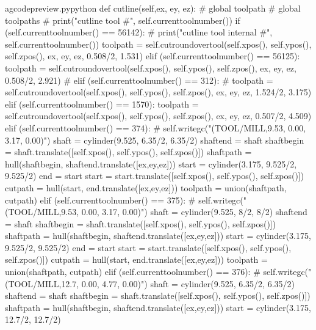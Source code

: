 \documentclass{ltxdoc}
\begin{document}
\lstset{firstnumber=\thegcpy}
\begin{writecode}{a}{gcodepreview.py}{python}
    def cutline(self,ex, ey, ez):
#        global toolpath
#        global toolpaths
#        print("cutline tool #", self.currenttoolnumber())
        if (self.currenttoolnumber() == 56142):
#                print("cutline tool internal #", self.currenttoolnumber())
            toolpath = self.cutroundovertool(self.xpos(), self.ypos(), self.zpos(), ex, ey, ez, 0.508/2, 1.531)
        elif (self.currenttoolnumber() == 56125):
            toolpath = self.cutroundovertool(self.xpos(), self.ypos(), self.zpos(), ex, ey, ez, 0.508/2, 2.921)
#        elif (self.currenttoolnumber() == 312):
#            toolpath = self.cutroundovertool(self.xpos(), self.ypos(), self.zpos(), ex, ey, ez, 1.524/2, 3.175)
        elif (self.currenttoolnumber() == 1570):
            toolpath = self.cutroundovertool(self.xpos(), self.ypos(), self.zpos(), ex, ey, ez, 0.507/2, 4.509)
        elif (self.currenttoolnumber() == 374):
#            self.writegc("(TOOL/MILL,9.53, 0.00, 3.17, 0.00)")
            shaft = cylinder(9.525, 6.35/2, 6.35/2)
            shaftend = shaft
            shaftbegin = shaft.translate([self.xpos(), self.ypos(), self.zpos()])
            shaftpath = hull(shaftbegin, shaftend.translate([ex,ey,ez]))
            start = cylinder(3.175, 9.525/2, 9.525/2)
            end = start
            start = start.translate([self.xpos(), self.ypos(), self.zpos()])
            cutpath = hull(start, end.translate([ex,ey,ez]))
            toolpath = union(shaftpath, cutpath)
        elif (self.currenttoolnumber() == 375):
#            self.writegc("(TOOL/MILL,9.53, 0.00, 3.17, 0.00)")
            shaft = cylinder(9.525, 8/2, 8/2)
            shaftend = shaft
            shaftbegin = shaft.translate([self.xpos(), self.ypos(), self.zpos()])
            shaftpath = hull(shaftbegin, shaftend.translate([ex,ey,ez]))
            start = cylinder(3.175, 9.525/2, 9.525/2)
            end = start
            start = start.translate([self.xpos(), self.ypos(), self.zpos()])
            cutpath = hull(start, end.translate([ex,ey,ez]))
            toolpath = union(shaftpath, cutpath)
        elif (self.currenttoolnumber() == 376):
#            self.writegc("(TOOL/MILL,12.7, 0.00, 4.77, 0.00)")
            shaft = cylinder(9.525, 6.35/2, 6.35/2)
            shaftend = shaft
            shaftbegin = shaft.translate([self.xpos(), self.ypos(), self.zpos()])
            shaftpath = hull(shaftbegin, shaftend.translate([ex,ey,ez]))
            start = cylinder(3.175, 12.7/2, 12.7/2)

\end{writecode}
\end{document}
